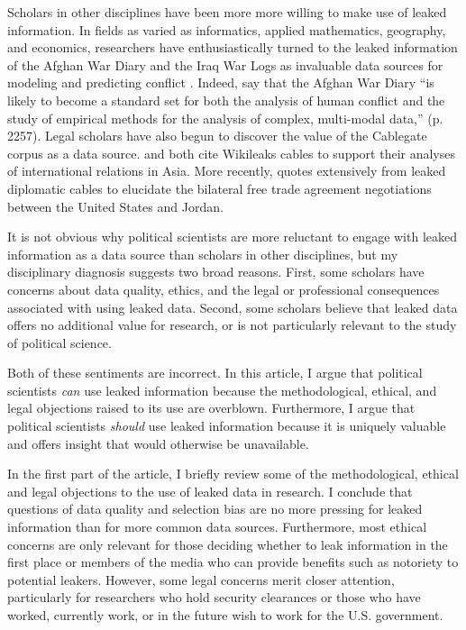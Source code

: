 \documentclass[12pt]{article}
\begin{document}
Scholars in other disciplines have been more more willing to make use of leaked information. 
In fields as varied as informatics, applied mathematics, geography, and economics, researchers have 
enthusiastically turned to the leaked information of the Afghan War Diary and the Iraq War Logs 
as invaluable data sources for modeling and predicting conflict \citep{linke2012space-time,zammit-mangion2012point,cseke2013sparse,rusch2013model,
zammit-mangion2013modeling}.
Indeed, \citet{dedeo2013bootstrap} say that the Afghan War Diary ``is likely to become 
a standard set for both the analysis of human conflict and the study of empirical methods for the 
analysis of complex, multi-modal data,'' (p. 2257). Legal scholars have also begun to discover 
the value of the Cablegate corpus as a data source. \citet{khoo2011what} and \citet{mendis2012destiny} 
both cite Wikileaks cables to support their analyses of international relations in Asia. 
More recently, \citet{el_said2012morning} quotes extensively from 
leaked diplomatic cables to elucidate the bilateral free trade agreement negotiations between the United States 
and Jordan. 

It is not obvious why political scientists are more reluctant to engage with 
leaked information as a data source than scholars in other disciplines, but my disciplinary 
diagnosis suggests two broad reasons. First, some scholars have concerns about data quality, 
ethics, and the legal or professional consequences associated with using leaked data. 
Second, some scholars believe that leaked data offers no additional value for research, 
or is not particularly relevant to the study of political science.

Both of these sentiments are incorrect. 
In this article, I argue that political scientists \emph{can} use leaked information because 
the methodological, ethical, and legal objections raised to its use are overblown. 
Furthermore, I argue that political scientists \emph{should} use leaked information because it 
is uniquely valuable and offers insight that would otherwise be unavailable.

In the first part of the article, I briefly review some of the methodological, ethical and legal objections to the use of leaked data 
in research. I conclude that 
questions of data quality and selection bias are no more pressing for leaked information 
than for more common data sources. Furthermore, most ethical concerns are only relevant for those deciding 
whether to leak information in the first place or members of the media who can provide benefits 
such as notoriety to potential leakers. However, some legal concerns merit closer attention, particularly for researchers 
who hold security clearances or those who have worked, currently work, or in the future wish to work for the U.S. government.
\end{document}
